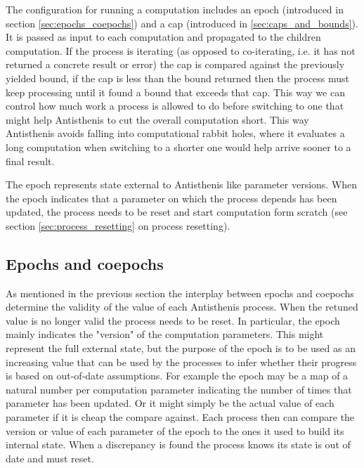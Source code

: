 The configuration for running a computation includes an epoch
(introduced in section \ref{sec:epochs_coepochs}) and a cap
(introduced in \ref{sec:caps_and_bounds}). It is passed as input to
each computation and propagated to the children computation. If the
process is iterating (as opposed to co-iterating, i.e. it has not
returned a concrete result or error) the cap is compared against the
previously yielded bound, if the cap is less than the bound returned
then the process must keep processing until it found a bound that
exceeds that cap. This way we can control how much work a process is
allowed to do before switching to one that might help Antisthenis to
cut the overall computation short. This way Antisthenis avoids falling
into computational rabbit holes, where it evaluates a long computation
when switching to a shorter one would help arrive sooner to a final
result.

The epoch represents state external to Antisthenis like parameter
versions. When the epoch indicates that a parameter on which the
process depends has been updated, the process needs to be reset and
start computation form scratch (see section
\ref{sec:process_resetting} on process resetting).


\subsection{Epochs and coepochs}

As mentioned in the previous section the interplay between epochs and
coepochs determine the validity of the value of each Antisthenis
process. When the retuned value is no longer valid the process needs
to be reset. In particular, the epoch mainly indicates the "version"
of the computation parameters. This might represent the full external
state, but the purpose of the epoch is to be used as an increasing
value that can be used by the processes to infer whether their
progress is based on out-of-date assumptions. For example the epoch
may be a map of a natural number per computation parameter indicating
the number of times that parameter has been updated. Or it might
simply be the actual value of each parameter if it is cheap the
compare against. Each process then can compare the version or value of
each parameter of the epoch to the ones it used to build its internal
state. When a discrepancy is found the process knows its state is out
of date and must reset.

